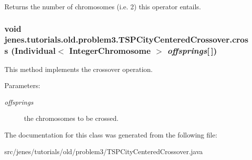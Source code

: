 Returns the number of chromosomes (i.e. 2) this operator entails. \hypertarget{classjenes_1_1tutorials_1_1old_1_1problem3_1_1_t_s_p_city_centered_crossover_d953284beb1ccab1a3eb78c37096a3fa}{
\subsubsection[cross]{\setlength{\rightskip}{0pt plus 5cm}void jenes.tutorials.old.problem3.TSPCityCenteredCrossover.cross (Individual$<$ {\bf IntegerChromosome} $>$ {\em offsprings}\mbox{[}$\,$\mbox{]})}}
\label{classjenes_1_1tutorials_1_1old_1_1problem3_1_1_t_s_p_city_centered_crossover_d953284beb1ccab1a3eb78c37096a3fa}


This method implements the crossover operation.

\begin{Desc}
\item[Parameters:]
\begin{description}
\item[{\em offsprings}]the chromosomes to be crossed. \end{description}
\end{Desc}


The documentation for this class was generated from the following file:\begin{CompactItemize}
\item 
src/jenes/tutorials/old/problem3/TSPCityCenteredCrossover.java\end{CompactItemize}
